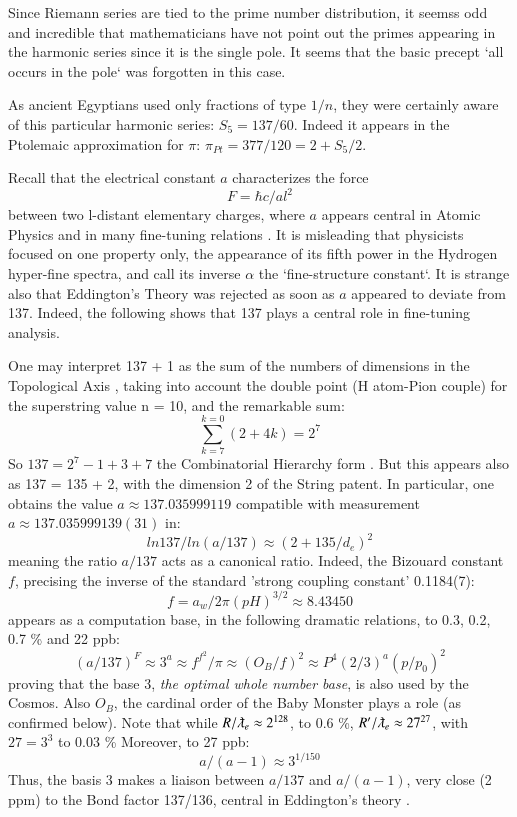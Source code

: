 \documentclass[twoside,draft]{article}
\begin{document}
\begin{sloppypar}
Since Riemann series are tied to the prime number distribution, it seemss odd and incredible that mathematicians
have not point out the primes appearing in the harmonic series since it is the single pole. It seems
that the basic precept `all occurs in the pole` was forgotten in this case. 

As ancient Egyptians used only fractions of type $1/n$, they were certainly aware of this particular harmonic series: 
$S_{5} = 137/60$. Indeed it appears in the Ptolemaic approximation for $\pi$: $\pi_{Pt} = 377/120 = 2 +  S_{5}/2$.

Recall that the electrical constant $a$ characterizes the force $$F =\hbar c/al^{2}$$ between two l-distant
elementary charges, where $a$ appears central in Atomic Physics and in many fine-tuning relations \cite{Carr}. It is
misleading that physicists focused on one property only, the appearance of its fifth power in the
Hydrogen hyper-fine spectra, and call its inverse $\alpha$ the `fine-structure constant`. It is strange also that
Eddington's Theory was rejected as soon as $a$ appeared to deviate from 137. Indeed, the
following shows that 137 plays a central role in fine-tuning analysis. 

One may interpret 137 + 1 as
the sum of the numbers of dimensions in the Topological Axis \cite{Sanchez1}, taking into account the double
point (H atom-Pion couple) for the superstring value n = 10, and the remarkable sum:
\begin{equation}
\sum_{k=7}^{k=0}(2 + 4 k ) = 2^{7}
\end{equation}
So $137 = 2^{7} - 1 + 3 + 7$ the Combinatorial Hierarchy form \cite{Sanchez1}. But this appears also as 137 = 135 + 2,
with the dimension 2 of the String patent. In particular, one obtains the value $a \approx 137.035999119$
compatible with measurement $a \approx 137.035999139(31)$ in:
\begin{equation}
ln137/ln(a/137) \approx (2+135/d_{e})^{2}
\end{equation}
meaning the ratio $a/137$ acts as a canonical ratio. Indeed, the Bizouard constant $f$, precising \cite{Sanchez1} the inverse of the standard 'strong coupling constant' 0.1184(7): $$f = a_w/2\pi(pH)^{3/2} \approx 8.43450$$ appears as a computation base, in the following dramatic relations, to 0.3, 0.2, 0.7 \% and 22 ppb:
$$(a/137)^F \approx 3^a \approx f^{f^2}/\pi \approx (O_B/f)^2 \approx P^4 (2/3)^a (p/p_0)^2 $$
proving that the base 3, \textit{the optimal whole number base}, is also used by the Cosmos. Also $O_B$, the cardinal order  of the Baby Monster plays a role (as confirmed below). 
Note that while $R/\lambdabar_e \approx 2^{128}$, to 0.6 \%, $R^{\prime}/\lambdabar_e \approx 27^{27}$, with $27 = 3^3$ to 0.03 \%  Moreover, to 27 ppb:
$$ a/(a-1) \approx 3^{1/150} $$
Thus, the basis 3 makes a liaison between $a/137$ and $a/(a-1)$, very close (2 ppm) to the Bond factor 137/136, central in Eddington's theory \cite{Eddington}.


\end{sloppypar}
\end{document}
